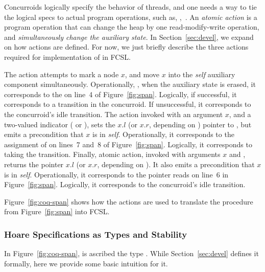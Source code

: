 Concurroids logically specify the behavior of threads, and one needs a
way to tie the logical specs to actual program operations, such as,
\eg,~.
% 
An \emph{atomic action} is a program operation that can change the
heap by one read-modify-write operation, and \emph{simultaneously
  change the auxiliary state}.  In Section~\ref{sec:devel}, we expand
on how actions are defined. %
For now, we just briefly describe the three actions required
for implementation of  in FCSL.

The  action attempts to mark a node $x$, and move $x$
into the \emph{self} auxiliary component
simultaneously. Operationally, \ie, when the auxiliary state is
erased, it corresponds to the  on line~4 of
Figure~\ref{fig:span}. Logically, if successful, it corresponds to
a  transition in the concurroid. If
unsuccessful, it corresponds to the concurroid's idle transition.
%
The  action invoked with an argument $x$, and a
two-valued indicator  ( or ), sets
the $x.l$ (or $x.r$, depending on ) pointer to ,
but emits a precondition that $x$ is in \emph{self}.  Operationally,
it corresponds to the assignment of  on lines~7 and~8 of
Figure~\ref{fig:span}. Logically, it corresponds to taking the
 transition.
%
Finally,  atomic action, invoked with arguments $x$
and , returns the pointer $x.l$ (or $x.r$, depending on
). It also emits a precondition that $x$ is in
\emph{self}. Operationally, it corresponds to the pointer reads on
line~6 in Figure~\ref{fig:span}. Logically, it corresponds to the
concurroid's idle transition.

Figure~\ref{fig:coq-span} shows how the actions are used to translate
the  procedure from Figure~\ref{fig:span} into FCSL.


\subsubsection{Hoare Specifications as Types and Stability}
\label{sec:semi-formal-spec}
%
In Figure~\ref{fig:coq-span},  is ascribed the type
. While Section~\ref{sec:devel} defines it formally,
here we provide some basic intuition for it.

